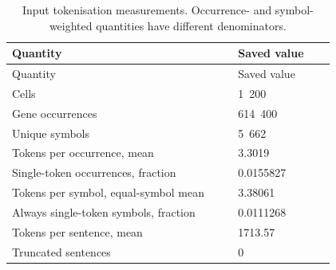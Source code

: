 \begin{longtable}{@{}L{0.63\linewidth}L{0.27\linewidth}@{}}
\caption{Input tokenisation measurements. Occurrence- and symbol-weighted quantities have different denominators.}\\
\toprule
Quantity & Saved value \\
\midrule
\endfirsthead
\toprule
Quantity & Saved value \\
\midrule
\endhead
\endfoot
\bottomrule
\endlastfoot
Cells & 1~200 \\
Gene occurrences & 614~400 \\
Unique symbols & 5~662 \\
Tokens per occurrence, mean & 3.3019 \\
Single-token occurrences, fraction & 0.0155827 \\
Tokens per symbol, equal-symbol mean & 3.38061 \\
Always single-token symbols, fraction & 0.0111268 \\
Tokens per sentence, mean & 1713.57 \\
Truncated sentences & 0 \\
\end{longtable}
